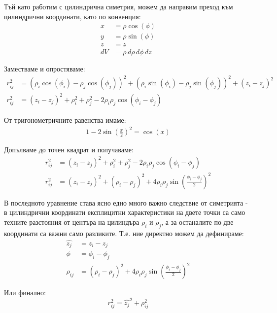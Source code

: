 Тъй като работим с цилиндрична симетрия, можем да направим преход към цилиндрични координати, като по конвенция:
\begin{align*}
	x  & = \rho \cos(\phi)           \\
	y  & = \rho \sin(\phi)           \\
	z  & = z                         \\
	dV & = \rho \,d\rho \,d\phi \,dz 
\end{align*}

Заместваме и опростяваме:
\begin{align*}
	r_{ij}^2 & = (\rho_{i}\cos(\phi_{i}) - \rho_{j}\cos(\phi_{j}))^2 + (\rho_{i}\sin(\phi_{i}) - \rho_{j}\sin(\phi_{j}))^2 + (z_i - z_j)^2 \\
	r_{ij}^2 & = (z_i - z_j)^2 + \rho_{i}^2 + \rho_{j}^2 - 2\rho_{i}\rho_{j}\cos{(\phi_i - \phi_j)}                                        
\end{align*}

От тригонометричните равенства имаме:
\begin{align*}
	1-2 \sin{\left(\frac{x}{2}\right)}^2=\cos (x) 
\end{align*}

Допълваме до точен квадрат и получаваме:
\begin{align*}
	r_{ij}^2 & = (z_i - z_j)^2 + \rho_{i}^2 + \rho_{j}^2 - 2\rho_{i}\rho_{j}\cos{(\phi_i - \phi_j)}                    \\
	r_{ij}^2 & = (z_i - z_j)^2  + (\rho_i - \rho_j)^2 + 4 \rho_i \rho_j \sin{\left( \frac{\phi_i-\phi_j}{2} \right)}^2 
\end{align*}

В последното уравнение става ясно едно много важно следствие от симетрията - в цилиндрични координати експлицитни характеристики на двете точки са само техните разстояния от центъра на 
цилиндъра $\rho_{i}$ и $\rho_j$, а за останалите по две координати са важни само разликите. Т.е. ние директно можем да дефинираме:
\begin{align*}
	\hat{z_j} & = z_i - z_j                                                                            \\
	\phi      & = \phi_i - \phi_j                                                                      \\
	\rho_{ij} & = (\rho_i - \rho_j)^2 + 4 \rho_i \rho_j \sin{\left( \frac{\phi_i-\phi_j}{2} \right)}^2 
\end{align*}

Или финално:
\begin{equation}
	\label{eq:cylindricalcoords}
	r_{ij}^2 =  \hat{z_{j}}^2 + \rho_{ij}^2
\end{equation}

